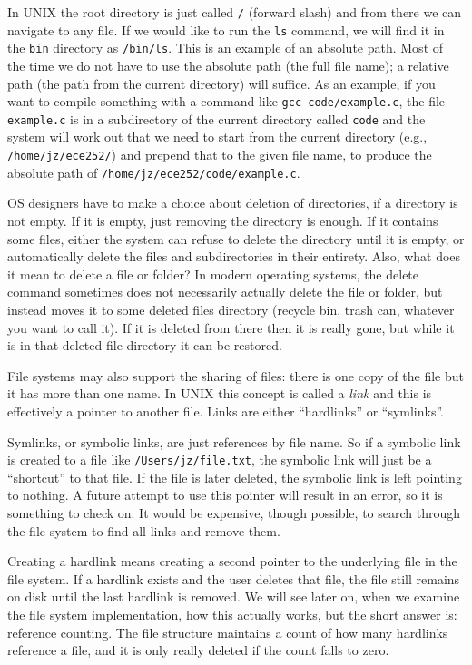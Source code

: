 In UNIX the root directory is just called \texttt{/} (forward slash) and from there we can navigate to any file. If we would like to run the \texttt{ls} command, we will find it in the \texttt{bin} directory as \texttt{/bin/ls}. This is an example of an absolute path. Most of the time we do not have to use the absolute path (the full file name); a relative path (the path from the current directory) will suffice. As an example, if you want to compile something with a command like \texttt{gcc code/example.c}, the file \texttt{example.c} is in a subdirectory of the current directory called \texttt{code} and the system will work out that we need to start from the current directory (e.g., \texttt{/home/jz/ece252/}) and prepend that to the given file name, to produce the absolute path of \texttt{/home/jz/ece252/code/example.c}.

OS designers have to make a choice about deletion of directories, if a directory is not empty. If it is empty, just removing the directory is enough. If it contains some files, either the system can refuse to delete the directory until it is empty, or automatically delete the files and subdirectories in their entirety. Also, what does it mean to delete a file or folder? In modern operating systems, the delete command sometimes does not necessarily actually delete the file or folder, but instead moves it to some deleted files directory (recycle bin, trash can, whatever you want to call it). If it is deleted from there then it is really gone, but while it is in that deleted file directory it can be restored.

File systems may also support the sharing of files: there is one copy of the file but it has more than one name. In UNIX this concept is called a \textit{link} and this is effectively a pointer to another file. Links are either ``hardlinks'' or ``symlinks''.

Symlinks, or symbolic links, are just references by file name. So if a symbolic link is created to a file like \texttt{/Users/jz/file.txt}, the symbolic link will just be a ``shortcut'' to that file. If the file is later deleted, the symbolic link is left pointing to nothing. A future attempt to use this pointer will result in an error, so it is something to check on. It would be expensive, though possible, to search through the file system to find all links and remove them.

Creating a hardlink means creating a second pointer to the underlying file in the file system. If a hardlink exists and the user deletes that file, the file still remains on disk until the last hardlink is removed. We will see later on, when we examine the file system implementation, how this actually works, but the short answer is: reference counting. The file structure maintains a count of how many hardlinks reference a file, and it is only really deleted if the count falls to zero.

